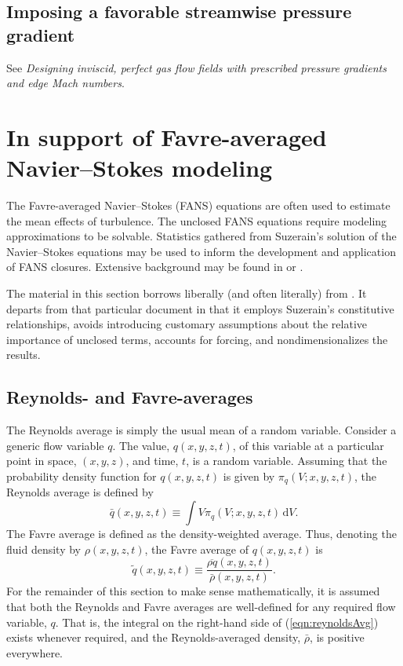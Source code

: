 \documentclass[letterpaper,11pt,nointlimits,reqno,draft]{amsbook}
\begin{document}
\section{Imposing a favorable streamwise pressure gradient}

See \emph{Designing inviscid, perfect gas flow fields with
prescribed pressure gradients and edge Mach numbers}.

\chapter{In support of Favre-averaged Navier--Stokes modeling}
\label{sec:supportFANS}

The Favre-averaged Navier--Stokes (FANS) equations are often used to estimate
the mean effects of turbulence.  The unclosed FANS equations require modeling
approximations to be solvable.  Statistics gathered from Suzerain's solution of
the Navier--Stokes equations may be used to inform the development and
application of FANS closures.  Extensive background may be found in
\citet{Chassaing2010} or \citet{SmitsDussauge2005}.

The material in this section borrows liberally (and often literally) from
\citet{OliverFANSModels2011}.  It departs from that particular document in that
it employs Suzerain's constitutive relationships, avoids introducing customary
assumptions about the relative importance of unclosed terms, accounts for
forcing, and nondimensionalizes the results.

\section{Reynolds- and Favre-averages}
\label{sec:averaging}

The Reynolds average is simply the usual mean of a random variable.  Consider a
generic flow variable $q$.  The value, $q(x, y, z, t)$, of this variable at a
particular point in space, $(x, y, z)$, and time, $t$, is a random variable.
Assuming that the probability density function for $q(x, y, z, t)$ is given by
$\pi_q(V; x, y, z, t)$, the Reynolds average is defined by
%
\begin{equation}
\label{eqn:reynoldsAvg}
\bar{q}(x, y, z, t) \equiv \int V \pi_q(V; x, y, z, t) \,\mathrm{d} V.
\end{equation}
%
The Favre average is defined as the density-weighted average.  Thus,
denoting the fluid density by $\rho(x,y,z, t)$, the Favre average of
$q(x,y,z, t)$ is
%
\begin{equation*}
\tilde{q}(x,y,z, t) \equiv \frac{ \overline{\rho q}(x,y,z, t) }{ \bar{\rho}(x,y,z, t) }.
\end{equation*}
%
For the remainder of this section to make sense mathematically, it is
assumed that both the Reynolds and Favre averages are well-defined for
any required flow variable, $q$.  That is, the integral on the
right-hand side of (\ref{eqn:reynoldsAvg}) exists whenever required,
and the Reynolds-averaged density, $\bar{\rho}$, is positive
everywhere.
\end{document}
